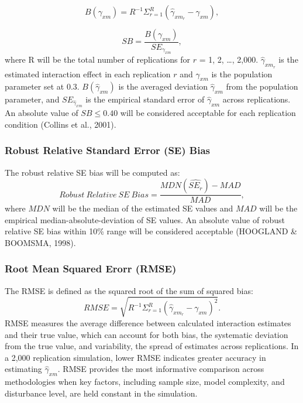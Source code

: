 \documentclass[
  11pt,
  man]{apa6}
\begin{document}
\begin{equation}
B(\gamma_{xm}) = R^{-1}\Sigma^{R}_{r = 1}(\hat{\gamma}_{xm_{r}} - \gamma_{xm}),
\end{equation}

\begin{equation}
SB = \frac{B(\gamma_{xm})}{SE_{\gamma_{xm}}},
\end{equation}
where R will be the total number of replications for \(r\) = 1, 2, \ldots, 2,000. \(\hat{\gamma}_{xm_{r}}\) is the estimated interaction effect in each replication \(r\) and \(\gamma_{xm}\) is the population parameter set at 0.3. \(B(\hat{\gamma}_{xm})\) is the averaged deviation \(\hat{\gamma}_{xm}\) from the population parameter, and \(SE_{\hat{\gamma}_{xm}}\) is the empirical standard error of \(\hat{\gamma}_{xm}\) across replications. An absolute value of \(SB \le 0.40\) will be considered acceptable for each replication condition (Collins et al., 2001).

\hypertarget{robust-relative-standard-error-se-bias}{%
\subsubsection{Robust Relative Standard Error (SE) Bias}\label{robust-relative-standard-error-se-bias}}

The robust relative SE bias will be computed as:
\begin{equation}
Robust\ Relative\ SE\ Bias = \frac{MDN(\widehat{SE_{r}}) - MAD}{MAD},
\end{equation}
where \(MDN\) will be the median of the estimated SE values and \(MAD\) will be the empirical median-absolute-deviation of SE values. An absolute value of robust relative SE bias within 10\% range will be considered acceptable (HOOGLAND \& BOOMSMA, 1998).

\hypertarget{root-mean-squared-erorr-rmse}{%
\subsubsection{Root Mean Squared Erorr (RMSE)}\label{root-mean-squared-erorr-rmse}}

The RMSE is defined as the squared root of the sum of squared bias:
\begin{equation}
RMSE = \sqrt{R^{-1}\Sigma^{R}_{r = 1}(\hat{\gamma}_{xm_{r}} - \gamma_{xm})^2}.
\end{equation}
RMSE measures the average difference between calculated interaction estimates and their true value, which can account for both bias, the systematic deviation from the true value, and variability, the spread of estimates across replications. In a 2,000 replication simulation, lower RMSE indicates greater accuracy in estimating \(\hat{\gamma}_{xm}\). RMSE provides the most informative comparison across methodologies when key factors, including sample size, model complexity, and disturbance level, are held constant in the simulation.
\end{document}
